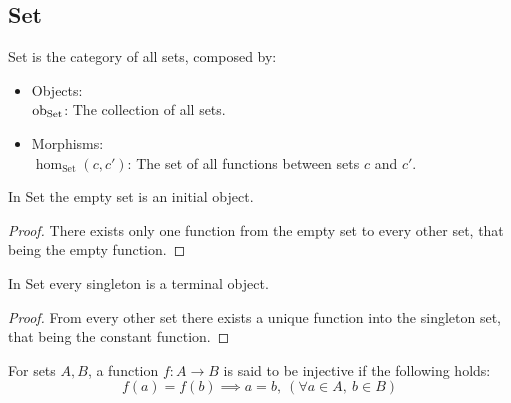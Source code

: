 \subsection{Set}
\begin{definition}
  Set is the category of all sets, composed by:
  \parencite{awodey:category_theory}
  \begin{itemize}
    \item Objects:\\
      $\mathrm{ob}_{\mathrm{Set}}$: The collection of all sets.
    \item Morphisms:\\
      $\hom_{\mathrm{Set}}(c, c')$: The set of all functions between sets $c$ and
      $c'$.
  \end{itemize}
\end{definition}

\begin{theorem}
  In Set the empty set is an initial object.

  \begin{proof}
    There exists only one function from the empty set to every other set, that
    being the empty function.
  \end{proof}
\end{theorem}

\begin{theorem}
  In Set every singleton is a terminal object.

  \begin{proof}
    From every other set there exists a unique function into the singleton set,
    that being the constant function.
  \end{proof}
\end{theorem}

\begin{definition}
  For sets $A,B$, a function $f:A\to B$ is said to be injective if the following
  holds:
  \[f(a)=f(b) \implies a=b,\ (\forall a\in A,\ b\in B)\]
\end{definition}

